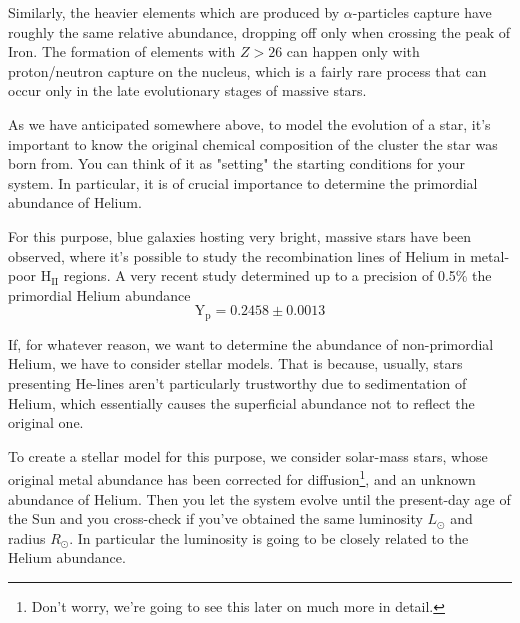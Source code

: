 \par Similarly, the heavier elements which are produced by $\alpha$-particles capture have roughly the same relative abundance, dropping off only when crossing the peak of Iron. The formation of elements with $Z > 26$ can happen only with proton/neutron capture on the nucleus, which is a fairly rare process that can occur only in the late evolutionary stages of massive stars.
\par As we have anticipated somewhere above, to model the evolution of a star, it's important to know the original chemical composition of the cluster the star was born from. You can think of it as "setting" the starting conditions for your system. In particular, it is of crucial importance to determine the primordial abundance of Helium.
\par For this purpose, blue galaxies hosting very bright, massive stars have been observed, where it's possible to study the recombination lines of Helium in metal-poor $\text{H}_{\text{II}}$ regions. A very recent study \cite{aver2026lbtymathrmpprojectiv} determined up to a precision of 0.5\% the primordial Helium abundance
\begin{equation*}
	\text{Y}_{\text{p}} = 0.2458 \pm 0.0013
\end{equation*}
\par If, for whatever reason, we want to determine the abundance of non-primordial Helium, we have to consider stellar models. That is because, usually, stars presenting He-lines aren't particularly trustworthy due to sedimentation of Helium, which essentially causes the superficial abundance not to reflect the original one.
\par To create a stellar model for this purpose, we consider solar-mass stars, whose original metal abundance has been corrected for diffusion\footnote{Don't worry, we're going to see this later on much more in detail.}, and an unknown abundance of Helium. Then you let the system evolve until the present-day age of the Sun and you cross-check if you've obtained the same luminosity $L_{\odot}$ and radius $R_{\odot}$. In particular the luminosity is going to be closely related to the Helium abundance.
